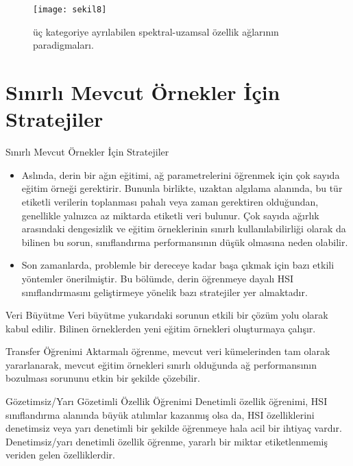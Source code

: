 \documentclass{beamer}
\begin{document}
\begin{frame}
\begin{figure}[]
	\centering
	\texttt{[image: sekil8]}
	\label{fig:sekil4}
	\caption{üç kategoriye ayrılabilen spektral-uzamsal özellik ağlarının paradigmaları.}
\end{figure}
\end{frame}

\section{Sınırlı Mevcut Örnekler İçin Stratejiler}
\begin{frame}{Sınırlı Mevcut Örnekler İçin Stratejiler}
\begin{itemize}
	\item Aslında, derin bir ağın eğitimi, ağ parametrelerini öğrenmek için çok sayıda eğitim örneği gerektirir. Bununla birlikte, uzaktan algılama alanında, bu tür etiketli verilerin toplanması pahalı veya zaman gerektiren olduğundan, genellikle yalnızca az miktarda etiketli veri bulunur. Çok sayıda ağırlık arasındaki dengesizlik ve eğitim örneklerinin sınırlı kullanılabilirliği olarak da bilinen bu sorun, sınıflandırma performansının düşük olmasına neden olabilir. 

	\item Son zamanlarda, problemle bir dereceye kadar başa çıkmak için bazı etkili yöntemler önerilmiştir. Bu bölümde, derin öğrenmeye dayalı HSI sınıflandırmasını geliştirmeye yönelik bazı stratejiler yer almaktadır.
\end{itemize}
\end{frame}

\begin{frame}{Veri Büyütme}
Veri büyütme yukarıdaki sorunun etkili bir çözüm yolu olarak kabul edilir. Bilinen örneklerden yeni eğitim örnekleri oluşturmaya çalışır.
\end{frame}

\begin{frame}{Transfer Öğrenimi}
Aktarmalı öğrenme, mevcut veri kümelerinden tam olarak yararlanarak, mevcut eğitim örnekleri sınırlı olduğunda ağ performansının bozulması sorununu etkin bir şekilde çözebilir.
\end{frame}

\begin{frame}{Gözetimsiz/Yarı Gözetimli Özellik Öğrenimi}
Denetimli özellik öğrenimi, HSI sınıflandırma alanında büyük atılımlar kazanmış olsa da, HSI özelliklerini denetimsiz veya yarı denetimli bir şekilde öğrenmeye hala acil bir ihtiyaç vardır. Denetimsiz/yarı denetimli özellik öğrenme, yararlı bir miktar etiketlenmemiş veriden gelen özelliklerdir.
\end{frame}
\end{document}
